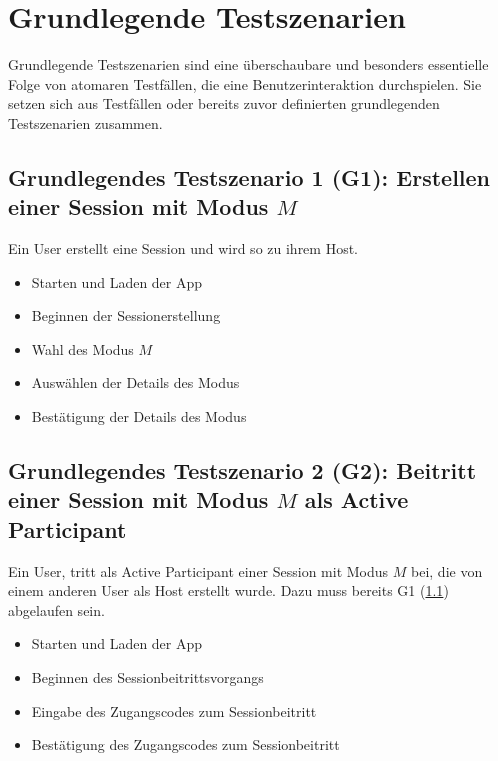 \documentclass[oneside, ngerman]{sdqtechreport}
\begin{document}
\section{Grundlegende Testszenarien}
\label{sec:Tests:GrundlegendeTestszenarien}

Grundlegende Testszenarien sind eine überschaubare und besonders essentielle Folge von atomaren Testfällen, die eine Benutzerinteraktion durchspielen. Sie setzen sich aus Testfällen oder bereits zuvor definierten grundlegenden Testszenarien zusammen.

\subsection{Grundlegendes Testszenario 1 (G1): Erstellen einer Session mit Modus $M$}
\label{subsec:Tests:GrundlegendeTestszenarien:G1}
Ein User erstellt eine Session und wird so zu ihrem Host.
\begin{itemize}
    \item Starten und Laden der App
    \item Beginnen der Sessionerstellung
    \item Wahl des Modus $M$
    \item Auswählen der Details des Modus
    \item Bestätigung der Details des Modus
\end{itemize}


\subsection{Grundlegendes Testszenario 2 (G2): Beitritt einer Session mit Modus $M$ als Active Participant}
\label{subsec:Tests:GrundlegendeTestszenarien:G2}
Ein User, tritt als Active Participant einer Session mit Modus $M$ bei, die von einem anderen User als Host erstellt wurde.
Dazu muss bereits G1 (\ref{subsec:Tests:GrundlegendeTestszenarien:G1}) abgelaufen sein.
\begin{itemize}
    \item Starten und Laden der App
    \item Beginnen des Sessionbeitrittsvorgangs
    \item Eingabe des Zugangscodes zum Sessionbeitritt
    \item Bestätigung des Zugangscodes zum Sessionbeitritt
\end{itemize}
\end{document}
